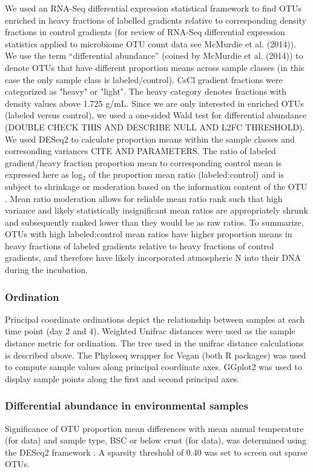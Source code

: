 We used an RNA-Seq differential expression statistical framework \cite{Love_2014} to find OTUs enriched in heavy fractions of labelled gradients relative to corresponding density fractions in control gradients (for review of RNA-Seq differential expression statistics applied to microbiome OTU count data see McMurdie et al. (2014)). We use the term “differential abundance” (coined by McMurdie et al. (2014)) to denote OTUs that have different proportion means across sample classes (in this case the only sample class is labeled/control). CsCl gradient fractions were categorized as "heavy" or "light". The heavy category denotes fractions with density values above 1.725 g/mL. Since we are only interested in enriched OTUs (labeled versus control), we used a one-sided Wald test for differential abundance (DOUBLE CHECK THIS AND DESCRIBE NULL AND L2FC THRESHOLD). We used DESeq2 to calculate proportion means within the sample classes and corresonding variances CITE AND PARAMETERS. The ratio of labeled gradient/heavy fraction proportion mean to corresponding control mean is expressed here as log$_{2}$ of the proportion mean ratio (labeled:control) and is subject to shrinkage or moderation based on the information content of the OTU \cite{Love_2014}. Mean ratio moderation allows for reliable mean ratio rank such that high variance and likely statistically insignificant mean ratios are appropriately shrunk and subsequently ranked lower than they would be as raw ratios. To summarize, OTUs with high labeled:control mean ratios have higher proportion means in heavy fractions of labeled gradients relative to heavy fractions of control gradients, and therefore have likely incorporated atmospheric N into their DNA during the incubation.

\subsubsection{Ordination}
Principal coordinate ordinations depict the relationship between samples at each time point (day 2 and 4). Weighted Unifrac distances \cite{16332807} were used as the sample distance metric for ordination. The tree used in the unifrac distance calculations is described above. The Phyloseq \cite{24699258} wrapper for Vegan \cite{vegan} (both R packages) was used to compute sample values along principal coordinate axes. GGplot2 \cite{ggplot2} was used to display sample points along the first and second principal axes.  

\subsubsection{Differential abundance in environmental samples}
Significance of OTU proportion mean differences with mean annual temperature (for \citet{Garcia_Pichel_2013} data) and sample type, BSC or below crust (for \citet{Steven_2013} data), was determined using the DESeq2 framework \cite{24699258, Love_2014}. A sparsity threshold of 0.40 was set to screen out sparse OTUs.  

